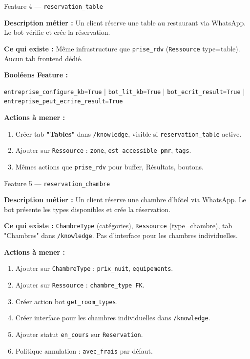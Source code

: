 \documentclass[11pt,a4paper]{article}
\newcommand{\slug}[1]{\texttt{\color{AGTDark}#1}}
\begin{document}
\begin{featurebox}{Feature 4 — \slug{reservation\_table}}

\textbf{Description métier :} Un client réserve une table au restaurant via
WhatsApp. Le bot vérifie et crée la réservation.

\textbf{Ce qui existe :} Même infrastructure que \slug{prise\_rdv}
(\slug{Ressource} type=table). Aucun tab frontend dédié.

\medskip
\textbf{Booléens Feature :}
\begin{decisionbox}
\texttt{entreprise\_configure\_kb=True} | \texttt{bot\_lit\_kb=True} |
\texttt{bot\_ecrit\_result=True} | \texttt{entreprise\_peut\_ecrire\_result=True}
\end{decisionbox}

\medskip
\textbf{Actions à mener :}
\begin{enumerate}
  \item Créer tab \textbf{"Tables"} dans \texttt{/knowledge},
        visible si \slug{reservation\_table} active.
  \item Ajouter sur \slug{Ressource} : \slug{zone}, \slug{est\_accessible\_pmr},
        \slug{tags}.
  \item Mêmes actions que \slug{prise\_rdv} pour buffer, Résultats, boutons.
\end{enumerate}

\end{featurebox}

\bigskip

\begin{featurebox}{Feature 5 — \slug{reservation\_chambre}}

\textbf{Description métier :} Un client réserve une chambre d'hôtel via WhatsApp.
Le bot présente les types disponibles et crée la réservation.

\textbf{Ce qui existe :} \slug{ChambreType} (catégories), \slug{Ressource}
(type=chambre), tab "Chambres" dans \texttt{/knowledge}. Pas d'interface pour
les chambres individuelles.

\medskip
\textbf{Actions à mener :}
\begin{enumerate}
  \item Ajouter sur \slug{ChambreType} : \slug{prix\_nuit}, \slug{equipements}.
  \item Ajouter sur \slug{Ressource} : \slug{chambre\_type FK}.
  \item Créer action bot \slug{get\_room\_types}.
  \item Créer interface pour les chambres individuelles dans \texttt{/knowledge}.
  \item Ajouter statut \texttt{en\_cours} sur \slug{Reservation}.
  \item Politique annulation : \texttt{avec\_frais} par défaut.
\end{enumerate}

\end{featurebox}
\end{document}
